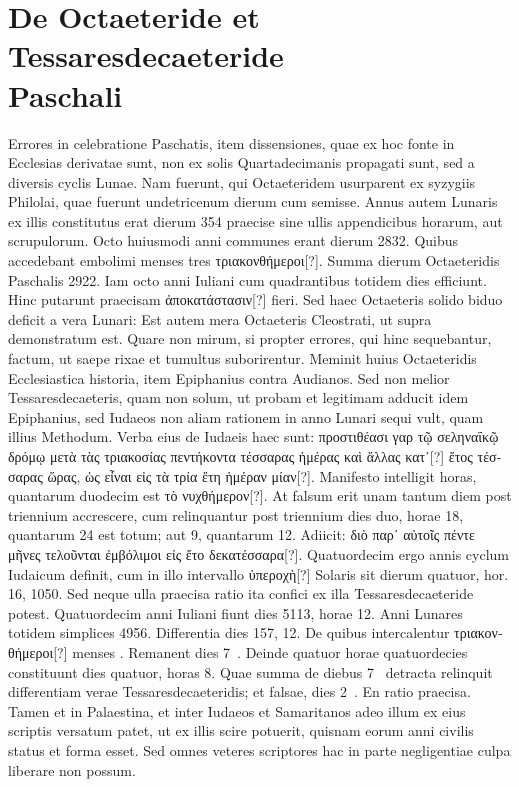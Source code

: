 \section[De Octaeteride et Tessaresdecaeteride Paschali]%
{De Octaeteride et Tessaresdecaeteride\\Paschali}
%
Errores in celebratione Paschatis, item dissensiones, quae ex
hoc fonte in Ecclesias derivatae sunt, non ex solis Quartadecimanis
propagati sunt, sed a diversis cyclis Lunae.
Nam fuerunt,
qui Octaeteridem usurparent ex syzygiis Philolai, quae fuerunt undetricenum
dierum cum semisse.
Annus autem Lunaris ex illis constitutus
erat dierum 354 praecise sine ullis appendicibus horarum, aut
scrupulorum.
Octo huiusmodi anni communes erant dierum 2832.
Quibus accedebant embolimi menses tres \textgreek{τριακονθήμεροι[?]}.
Summa dierum
Octaeteridis Paschalis 2922.
Iam octo anni Iuliani cum quadrantibus
totidem dies efficiunt.
Hinc putarunt praecisam \textgreek{ἀποκατάστασιν[?]}
fieri.
Sed haec Octaeteris solido biduo deficit a vera Lunari:
Est autem mera Octaeteris Cleostrati, ut supra demonstratum
est.
Quare non mirum, si propter errores, qui hinc sequebantur,
factum, ut saepe rixae et tumultus suborirentur.
Meminit huius
Octaeteridis Ecclesiastica historia, item Epiphanius contra Audianos.
Sed non melior Tessaresdecaeteris, quam non solum, ut probam
et legitimam adducit idem Epiphanius, sed Iudaeos non aliam
rationem in anno Lunari sequi vult, quam illius Methodum.
Verba
eius de Iudaeis haec sunt:
 \textgreek{προστιθέασι γαρ τῷ σεληναΐκῷ δρόμῳ μετὰ
τὰς τριακοσίας πεντήκοντα τέσσαρας ἡμέρας καὶ ἄλλας κατ᾽[?] ἔτος τέσσαρας
ὥρας, ὡς εἶναι εἰς τὰ τρία ἔτη ἡμέραν μίαν[?]}.
Manifesto intelligit
horas, quantarum duodecim est \textgreek{τὸ νυχθήμερον[?]}.
At falsum erit
unam tantum diem post triennium accrescere, cum relinquantur post
triennium dies duo, horae 18, quantarum 24 est totum; aut 9, quantarum
12.
%
Adiicit:
 \textgreek{διὸ παρ᾽ αὐτοῖς πέντε μῆνες τελοῦνται ἐμβόλιμοι εἰς ἔτο δεκατέσσαρα[?]}.
Quatuordecim ergo annis cyclum Iudaicum definit, cum
in illo intervallo \textgreek{ὑπεροχὴ[?]} Solaris sit dierum quatuor,
 hor. 16, 1050. %
Sed neque ulla praecisa ratio ita confici ex illa
 Tessaresdecaeteride potest.
Quatuordecim anni Iuliani fiunt dies 5113, horae 12.
Anni Lunares
totidem simplices 4956.
Differentia dies 157, 12.
De quibus intercalentur
\textgreek{τριακονθήμεροι[?]} menses .
Remanent dies 7~.
Deinde quatuor
horae quatuordecies constituunt dies quatuor, horas 8.
Quae summa
de diebus 7~ detracta relinquit differentiam verae
 Tessaresdecaeteridis;
et falsae, dies 2~.
En ratio praecisa.
Tamen et in Palaestina, et
inter Iudaeos et Samaritanos adeo illum ex eius scriptis versatum patet,
ut ex illis scire potuerit, quisnam eorum anni civilis status et forma
esset.
Sed omnes veteres scriptores hac in parte negligentiae culpa
liberare non possum.
%
